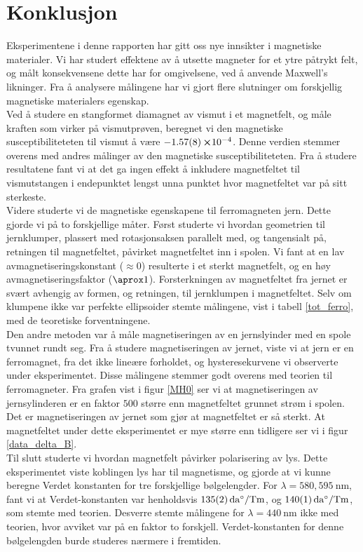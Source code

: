 \documentclass[%
 reprint,
 amsmath,amssymb,
 aps,
 norsk,
]{revtex4-1}
\begin{document}
\section{Konklusjon}
Eksperimentene i denne rapporten har gitt oss nye innsikter i magnetiske materialer. Vi har studert effektene av å utsette magneter for et ytre påtrykt felt, og målt konsekvensene dette har for omgivelsene, ved å anvende Maxwell's likninger. Fra å analysere målingene har vi gjort flere slutninger om forskjellig magnetiske materialers egenskap.\\
Ved å studere en stangformet diamagnet av vismut i et magnetfelt, og måle kraften som virker på vismutprøven, beregnet vi den magnetiske susceptibiliteteten til vismut å være $-\SI{1.57\pm0.08}\cross 10^{-4}$. Denne verdien stemmer overens med andres målinger av den magnetiske susceptibiliteteten. Fra å studere resultatene fant vi at det ga ingen effekt å inkludere magnetfeltet til vismutstangen i endepunktet lengst unna punktet hvor magnetfeltet var på sitt sterkeste.\\
Videre studerte vi de magnetiske egenskapene til ferromagneten jern. Dette gjorde vi på to forskjellige måter. Først studerte vi hvordan geometrien til jernklumper, plassert med rotasjonsaksen parallelt med, og tangensialt på, retningen til magnetfeltet, påvirket magnetfeltet inn i spolen. Vi fant at en lav avmagnetiseringskonstant ($\approx 0$) resulterte i et sterkt magnetfelt, og en høy avmagnetiseringsfaktor ($\aprox 1$). Forsterkningen av magnetfeltet fra jernet er svært avhengig av formen, og retningen, til jernklumpen i magnetfeltet. Selv om klumpene ikke var perfekte ellipsoider stemte målingene, vist i tabell \vref{tot_ferro}, med de teoretiske forventningene.\\
Den andre metoden var å måle magnetiseringen av en jernslyinder med en spole tvunnet rundt seg. Fra å studere magnetiseringen av jernet, viste vi at jern er en ferromagnet, fra det ikke lineære forholdet, og hysteresekurvene vi observerte under eksperimentet. Disse målingene stemmer godt overens med teorien til ferromagneter. Fra grafen vist i figur \vref{MH0} ser vi at magnetiseringen av jernsylinderen er en faktor $500$ større enn magnetfeltet grunnet strøm i spolen. Det er magnetiseringen av jernet som gjør at magnetfeltet er så sterkt. At magnetfeltet under dette eksperimentet er mye større enn tidligere ser vi i figur \vref{data_delta_B}. \\
Til slutt studerte vi hvordan magnetfelt påvirker polarisering av lys. Dette eksperimentet viste koblingen lys har til magnetisme, og gjorde at vi kunne beregne Verdet konstanten for tre forskjellige bølgelengder. For $\lambda = 580, \SI{595}{\nano\meter}$, fant vi at Verdet-konstanten var henholdsvis $\SI{135\pm2}{\deca\degree/\tesla\meter}$, og $\SI{140\pm1}{\deca\degree/\tesla\meter}$, som stemte med teorien. Desverre stemte målingene for $\lambda=\SI{440}{\nano\meter}$ ikke med teorien, hvor avviket var på en faktor to forskjell. Verdet-konstanten for denne bølgelengden burde studeres nærmere i fremtiden.
{}

\end{document}
